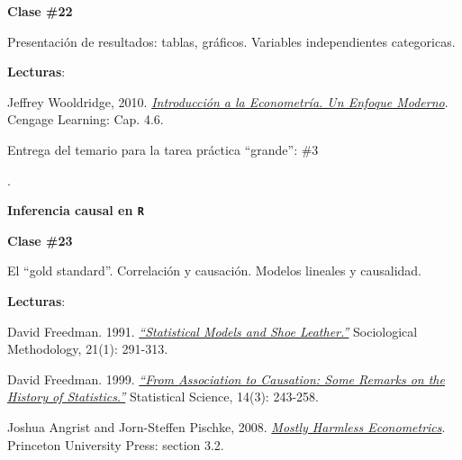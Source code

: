 \documentclass[letterpaper]{article}
\renewenvironment{itemize}{
  \begin{list}{}{
    \setlength{\leftmargin}{1.5em}
  }
}{
  \end{list}
}
\begin{document}
\begin{enumerate}
      \begin{itemize} 
        \item[$\bullet$] {\bf Clase \#22}
          \begin{itemize} 
            \item[$\circ$] Presentaci\'on de resultados: tablas, gr\'aficos. Variables independientes categoricas.
            \item[$\circ$] {\bf Lecturas}: 
              \begin{itemize}
                \item[$\diamond$] Jeffrey Wooldridge, 2010. \href{https://github.com/hbahamonde/Metodos_Cuanti_I/raw/master/Readings/Wooldridge.pdf}{\emph{Introducci\'on a la Econometr\'ia. Un Enfoque Moderno}}. Cengage Learning: Cap. 4.6.
              \end{itemize}
        {\color{orange}\item[$\bigstar$] Entrega del temario para la tarea pr\'actica ``grande'': \#3}.
          \end{itemize}
      \end{itemize}


  \item {\bf Inferencia causal en \texttt{R}}


      \begin{itemize} 
        \item[$\bullet$] {\bf Clase \#23}
          \begin{itemize} 
            \item[$\circ$] El ``gold standard''. Correlaci\'on y causaci\'on. Modelos lineales y causalidad.
            \item[$\circ$] {\bf Lecturas}: 
              \begin{itemize}
                \item[$\diamond$] David Freedman. 1991. \href{https://github.com/hbahamonde/Metodos_Cuanti_I/raw/master/Readings/Freedman1991.pdf}{\emph{``Statistical Models and Shoe Leather.''}} Sociological Methodology, 21(1): 291-313.
                \item[$\diamond$] David Freedman. 1999. \href{https://github.com/hbahamonde/Metodos_Cuanti_I/raw/master/Readings/Association_to_Causation.pdf}{\emph{``From Association to Causation: Some Remarks on the History of Statistics.''}} Statistical Science, 14(3): 243-258.
                \item[$\diamond$] Joshua Angrist and Jorn-Steffen Pischke, 2008. \href{https://github.com/hbahamonde/Metodos_Cuanti_I/raw/master/Readings/MHE.pdf}{\emph{Mostly Harmless Econometrics}}. Princeton University Press: section 3.2.
              \end{itemize}
          \end{itemize}
      \end{itemize}






\end{enumerate}
\end{document}
